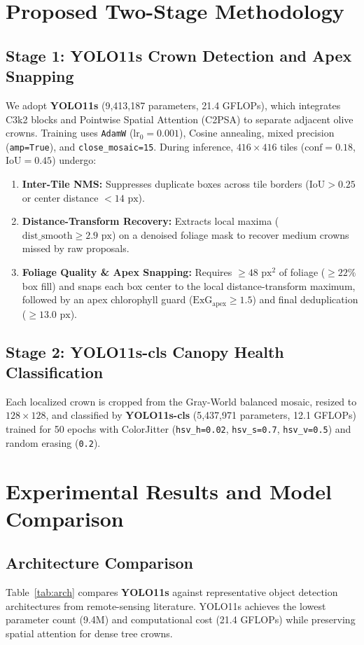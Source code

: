\documentclass[runningheads]{llncs}
\begin{document}
\section{Proposed Two-Stage Methodology}
\subsection{Stage 1: YOLO11s Crown Detection and Apex Snapping}
We adopt \textbf{YOLO11s} (9,413,187 parameters, 21.4 GFLOPs), which integrates C3k2 blocks and Pointwise Spatial Attention (C2PSA) to separate adjacent olive crowns. Training uses \texttt{AdamW} ($\text{lr}_0=0.001$), Cosine annealing, mixed precision (\texttt{amp=True}), and \texttt{close\_mosaic=15}. During inference, $416\times416$ tiles ($\text{conf}=0.18$, $\text{IoU}=0.45$) undergo:
\begin{enumerate}
    \item \textbf{Inter-Tile NMS:} Suppresses duplicate boxes across tile borders ($\text{IoU}>0.25$ or center distance $<14\text{ px}$).
    \item \textbf{Distance-Transform Recovery:} Extracts local maxima ($\text{dist\_smooth} \ge 2.9\text{ px}$) on a denoised foliage mask to recover medium crowns missed by raw proposals.
    \item \textbf{Foliage Quality \& Apex Snapping:} Requires $\ge48\text{ px}^2$ of foliage ($\ge22\%$ box fill) and snaps each box center to the local distance-transform maximum, followed by an apex chlorophyll guard ($\text{ExG}_{\text{apex}} \ge 1.5$) and final deduplication ($\ge13.0\text{ px}$).
\end{enumerate}

\subsection{Stage 2: YOLO11s-cls Canopy Health Classification}
Each localized crown is cropped from the Gray-World balanced mosaic, resized to $128\times128$, and classified by \textbf{YOLO11s-cls} (5,437,971 parameters, 12.1 GFLOPs) trained for 50 epochs with ColorJitter (\texttt{hsv\_h=0.02}, \texttt{hsv\_s=0.7}, \texttt{hsv\_v=0.5}) and random erasing (\texttt{0.2}).

\section{Experimental Results and Model Comparison}
\subsection{Architecture Comparison}
Table~\ref{tab:arch} compares \textbf{YOLO11s} against representative object detection architectures from remote-sensing literature. YOLO11s achieves the lowest parameter count (9.4M) and computational cost (21.4 GFLOPs) while preserving spatial attention for dense tree crowns.
\end{document}
